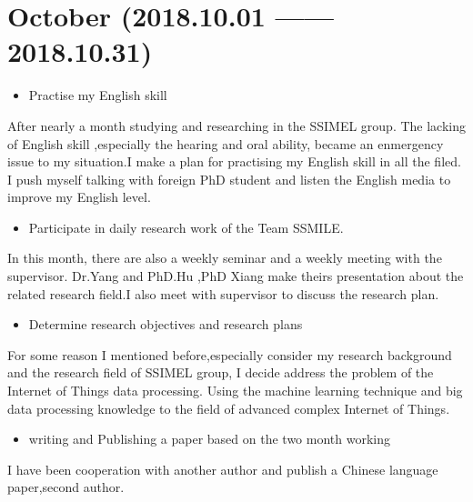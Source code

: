\documentclass[12pt]{article}
\begin{document}
\section{October  \small{(2018.10.01 —— 2018.10.31)} }
\begin{itemize}
    \item Practise my English skill
\end{itemize}
\par \vspace{-0.4cm}
After nearly a month studying and researching in the SSIMEL group. The lacking of English skill ,especially the hearing and oral ability, became an enmergency issue to my situation.I make a plan for practising my English skill in all the filed. I push myself talking with foreign PhD student and listen the English media to improve my English level.
\begin{itemize}
    \item Participate in daily research work of the Team SSMILE.
\end{itemize}  
\par \vspace{-0.4cm}
In this month, there are also a weekly seminar and a weekly meeting with the supervisor. Dr.Yang and PhD.Hu ,PhD Xiang make theirs presentation about the related research field.I also meet with supervisor to discuss the research  plan.

\begin{itemize}
    \item Determine research objectives and research plans
\end{itemize}  
\par \vspace{-0.4cm}
For some reason I mentioned before,especially consider my research background and the research field of SSIMEL group, I decide address the problem of the Internet of Things data processing. Using the machine learning technique and big data processing knowledge to  the field of advanced complex Internet of Things.

\begin{itemize}
    \item writing and Publishing a paper based on the two month working
\end{itemize}  
\par \vspace{-0.4cm}
I have been cooperation with another author and publish a Chinese language paper,second author.
\end{document}
